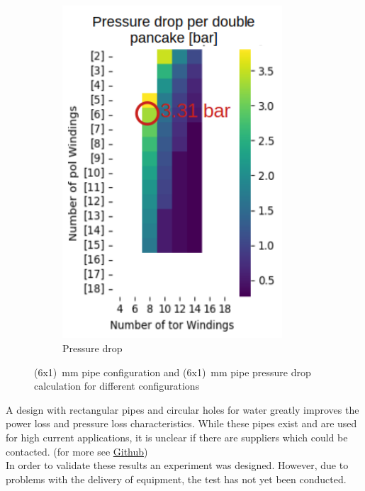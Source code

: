 \begin{figure}[h]
\begin{subfigure}[b]{0.3\textwidth}
        \includegraphics[width=0.9\textwidth]{Images/02_Coils/pressure.png}
        \caption{Pressure drop}
        \label{fig:pressure}
    \end{subfigure}
    \caption{(6x1)~mm pipe configuration and (6x1)~mm pipe pressure drop calculation for different configurations}
    \label{fig:both}
\end{figure}

A design with rectangular pipes and circular holes for water greatly improves the power loss and pressure loss characteristics. %
While these pipes exist and are used for high current applications, it is unclear if there are suppliers which could be contacted. %
(for more see \href{https://github.com/LiigaSoolane/coil}{Github})\\
In order to validate these results an experiment was designed.
However, due to problems with the delivery of equipment, the test has not yet been conducted.\\
